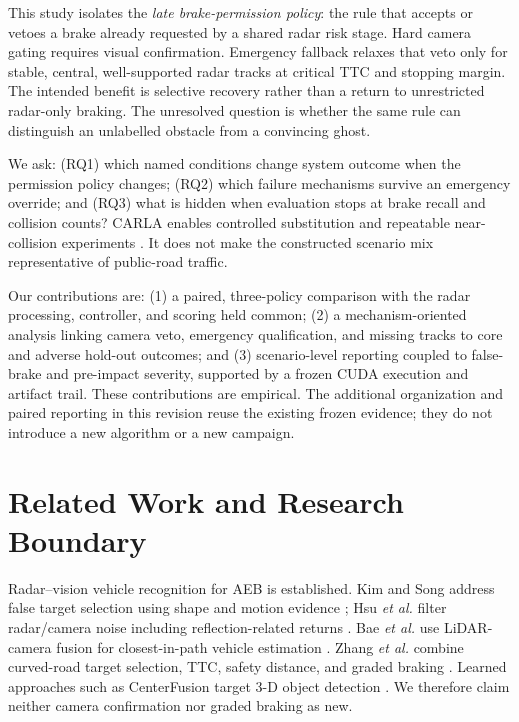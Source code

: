 \documentclass[conference]{IEEEtran}
\begin{document}
This study isolates the \emph{late brake-permission policy}: the rule that
accepts or vetoes a brake already requested by a shared radar risk stage.
Hard camera gating requires visual confirmation. Emergency fallback relaxes
that veto only for stable, central, well-supported radar tracks at critical TTC
and stopping margin. The intended benefit is selective recovery rather than a
return to unrestricted radar-only braking. The unresolved question is whether
the same rule can distinguish an unlabelled obstacle from a convincing ghost.

We ask: (RQ1) which named conditions change system outcome when the permission
policy changes; (RQ2) which failure mechanisms survive an emergency override;
and (RQ3) what is hidden when evaluation stops at brake recall and collision
counts? CARLA enables controlled substitution and repeatable near-collision
experiments \cite{dosovitskiy2017carla,kang2019testing}. It does not make the
constructed scenario mix representative of public-road traffic.

Our contributions are: (1) a paired, three-policy comparison with the radar
processing, controller, and scoring held common; (2) a mechanism-oriented
analysis linking camera veto, emergency qualification, and missing tracks to
core and adverse hold-out outcomes; and (3) scenario-level reporting coupled to
false-brake and pre-impact severity, supported by a frozen CUDA execution and
artifact trail. These contributions are empirical. The additional organization
and paired reporting in this revision reuse the existing frozen evidence; they
do not introduce a new algorithm or a new campaign.

\section{Related Work and Research Boundary}
Radar--vision vehicle recognition for AEB is established. Kim and Song address
false target selection using shape and motion evidence \cite{kim2013vehicle};
Hsu \emph{et al.} filter radar/camera noise including reflection-related returns
\cite{hsu2015noise}. Bae \emph{et al.} use LiDAR-camera fusion for closest-in-path
vehicle estimation \cite{bae2021cipv}. Zhang \emph{et al.} combine curved-road
target selection, TTC, safety distance, and graded braking
\cite{zhang2023curved}. Learned approaches such as CenterFusion target 3-D
object detection \cite{nabati2021centerfusion}. We therefore claim neither
camera confirmation nor graded braking as new.
\end{document}
